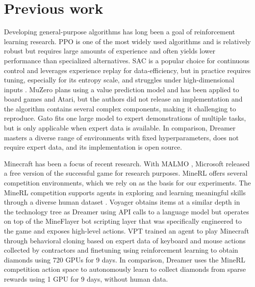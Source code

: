 \pagebreak
\section*{Previous work}
\label{sec:related}

Developing general-purpose algorithms has long been a goal of reinforcement learning research.
PPO \citep{schulman2017ppo} is one of the most widely used algorithms and is relatively robust but requires large amounts of experience and often yields lower performance than specialized alternatives.
SAC \citep{haarnoja2018sac} is a popular choice for continuous control and leverages experience replay for data-efficiency, but in practice requires tuning, especially for its entropy scale, and struggles under high-dimensional inputs \citep{yarats2019sacae}.
MuZero \citep{schrittwieser2019muzero} plans using a value prediction model and has been applied to board games and Atari, but the authors did not release an implementation and the algorithm contains several complex components, making it challenging to reproduce.
Gato \citep{reed2022gato} fits one large model to expert demonstrations of multiple tasks, but is only applicable when expert data is available.
In comparison, Dreamer masters a diverse range of environments with fixed hyperparameters, does not require expert data, and its implementation is open source.

Minecraft has been a focus of recent research. With MALMO \citep{johnson2016malmo}, Microsoft released a free version of the successful game for research purposes.
MineRL \citep{guss2019minerl} offers several competition environments, which we rely on as the basis for our experiments.
The MineRL competition supports agents in exploring and learning meaningful skills through a diverse human dataset \citep{guss2019minerl}.
Voyager obtains items at a similar depth in the technology tree as Dreamer using API calls to a language model but operates on top of the MineFlayer bot scripting layer that was specifically engineered to the game and exposes high-level actions\citep{wang2023voyager}.
VPT \citep{baker2022vpt} trained an agent to play Minecraft through behavioral cloning based on expert data of keyboard and mouse actions collected by contractors and finetuning using reinforcement learning to obtain diamonds using 720 GPUs for 9 days.
In comparison, Dreamer uses the MineRL competition action space to autonomously learn to collect diamonds from sparse rewards using 1 GPU for 9 days, without human data.
